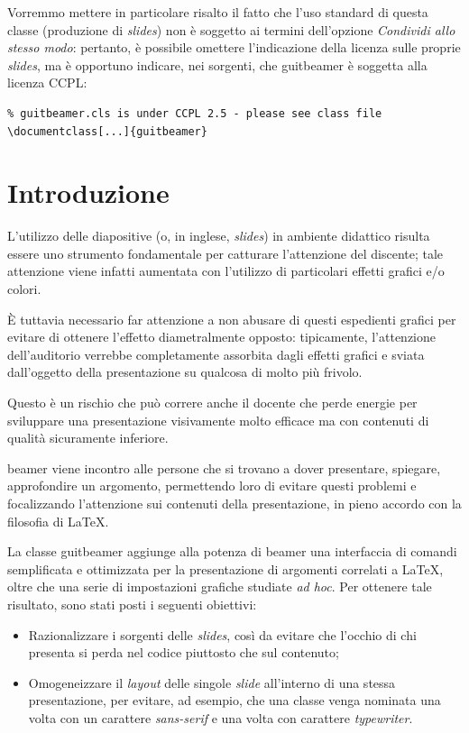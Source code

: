 \documentclass[a4paper,10pt]{article}
\newcommand{\lcap}{{\fontencoding{T1}\selectfont\guillemotleft}}
\newcommand{\rcap}{{\fontencoding{T1}\selectfont\guillemotright}}
\newcommand{\Cap}[1]{\lcap #1\rcap}
\newcommand{\pkg}[1]{\textsf{#1}}
\let\cls\pkg
\begin{document}
Vorremmo mettere in particolare risalto il fatto che l'uso standard di
questa classe (produzione di \textit{slides}) non è soggetto ai
termini dell'opzione \emph{Condividi allo stesso modo}: pertanto, è
possibile omettere l'indicazione della licenza sulle proprie
\textit{slides}, ma è opportuno indicare, nei sorgenti, che
\cls{guitbeamer} è soggetta alla licenza CCPL:
\begin{verbatim}
% guitbeamer.cls is under CCPL 2.5 - please see class file
\documentclass[...]{guitbeamer}
\end{verbatim}

\section{Introduzione}
L'utilizzo delle diapositive (o, in inglese, \textit{slides}) in
ambiente didattico risulta essere uno strumento fondamentale per
catturare l'attenzione del discente; tale attenzione viene infatti
aumentata con l'utilizzo di particolari effetti grafici e/o colori.

\`E tuttavia necessario far attenzione a non abusare di questi
espedienti grafici per evitare di ottenere l'effetto diametralmente
opposto: tipicamente, l'attenzione dell'auditorio verrebbe
completamente assorbita dagli effetti grafici e sviata dall'oggetto
della presentazione su qualcosa di molto più frivolo.

Questo è un rischio che può correre anche il docente che \Cap{perde
energie} per sviluppare una presentazione visivamente molto efficace
ma con contenuti di qualità sicuramente inferiore.

\cls{beamer} viene incontro alle persone che si trovano a dover
presentare, spiegare, approfondire un argomento, permettendo loro di
evitare questi problemi e focalizzando l'attenzione sui contenuti
della presentazione, in pieno accordo con la filosofia di \LaTeX.

La classe \cls{guitbeamer} aggiunge alla potenza di \cls{beamer} una
interfaccia di comandi semplificata e ottimizzata per la presentazione
di argomenti correlati a \LaTeX, oltre che una serie di impostazioni
grafiche studiate \emph{ad hoc}. Per ottenere tale risultato, sono
stati posti i seguenti obiettivi: 
\begin{itemize}
  \item Razionalizzare i sorgenti delle \emph{slides}, così da evitare
    che l'occhio di chi presenta si perda nel codice piuttosto che sul
    contenuto;
  \item Omogeneizzare il \textit{layout} delle singole \emph{slide}
    all'interno di una stessa presentazione, per evitare, ad esempio,
    che una classe venga \Cap{nominata} una volta con un carattere
    \textit{sans-serif} e una volta con carattere \textit{typewriter}.
\end{itemize}
\end{document}
